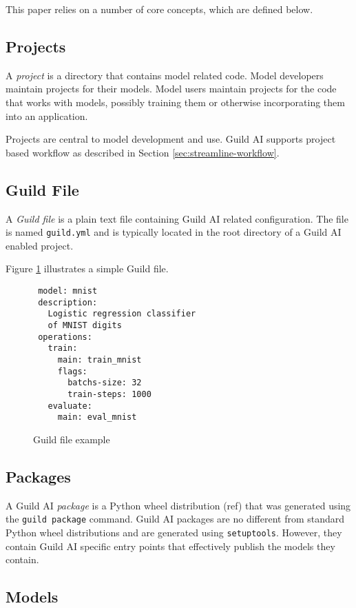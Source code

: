 \documentclass{article}
\begin{document}
This paper relies on a number of core concepts, which are defined
below.

\subsection{Projects}

A \emph{project} is a directory that contains model related
code. Model developers maintain projects for their models. Model users
maintain projects for the code that works with models, possibly
training them or otherwise incorporating them into an application.

Projects are central to model development and use. Guild AI supports
project based workflow as described in Section
\ref{sec:streamline-workflow}.

\subsection{Guild File}

A \emph{Guild file} is a plain text file containing Guild AI related
configuration. The file is named \verb|guild.yml| and is typically
located in the root directory of a Guild AI enabled project.

Figure \ref{fig:guild-file} illustrates a simple Guild file.

\begin{figure}
{\footnotesize
\begin{verbatim}
 model: mnist
 description:
   Logistic regression classifier
   of MNIST digits
 operations:
   train:
     main: train_mnist
     flags:
       batchs-size: 32
       train-steps: 1000
   evaluate:
     main: eval_mnist
\end{verbatim}}
\caption{Guild file example}
\label{fig:guild-file}
\end{figure}

\subsection{Packages}

A Guild AI \emph{package} is a Python wheel distribution (ref) that
was generated using the \verb|guild package| command. Guild AI
packages are no different from standard Python wheel distributions and
are generated using \verb|setuptools|. However, they contain Guild AI
specific entry points that effectively publish the models they
contain.

\subsection{Models}
\end{document}
